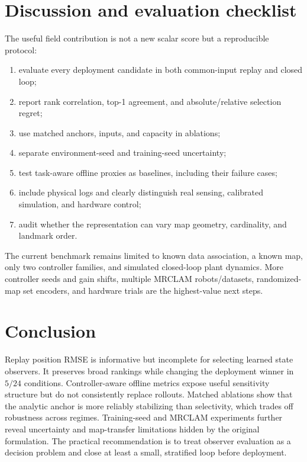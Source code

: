 \documentclass{article}
\begin{document}
\section{Discussion and evaluation checklist}
The useful field contribution is not a new scalar score but a reproducible protocol:
\begin{enumerate}
\item evaluate every deployment candidate in both common-input replay and closed loop;
\item report rank correlation, top-1 agreement, and absolute/relative selection regret;
\item use matched anchors, inputs, and capacity in ablations;
\item separate environment-seed and training-seed uncertainty;
\item test task-aware offline proxies as baselines, including their failure cases;
\item include physical logs and clearly distinguish real sensing, calibrated simulation, and hardware control;
\item audit whether the representation can vary map geometry, cardinality, and landmark order.
\end{enumerate}
The current benchmark remains limited to known data association, a known map, only two controller families, and simulated closed-loop plant dynamics. More controller seeds and gain shifts, multiple MRCLAM robots/datasets, randomized-map set encoders, and hardware trials are the highest-value next steps.

\section{Conclusion}
Replay position RMSE is informative but incomplete for selecting learned state observers. It preserves broad rankings while changing the deployment winner in $5/24$ conditions. Controller-aware offline metrics expose useful sensitivity structure but do not consistently replace rollouts. Matched ablations show that the analytic anchor is more reliably stabilizing than selectivity, which trades off robustness across regimes. Training-seed and MRCLAM experiments further reveal uncertainty and map-transfer limitations hidden by the original formulation. The practical recommendation is to treat observer evaluation as a decision problem and close at least a small, stratified loop before deployment.
\end{document}
